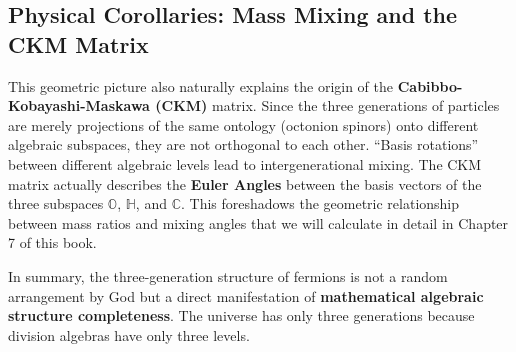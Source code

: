 \subsection{Physical Corollaries: Mass Mixing and the CKM Matrix}

This geometric picture also naturally explains the origin of the \textbf{Cabibbo-Kobayashi-Maskawa (CKM)} matrix.
Since the three generations of particles are merely projections of the same ontology (octonion spinors) onto different algebraic subspaces, they are not orthogonal to each other. ``Basis rotations'' between different algebraic levels lead to intergenerational mixing.
The CKM matrix actually describes the \textbf{Euler Angles} between the basis vectors of the three subspaces $\mathbb{O}$, $\mathbb{H}$, and $\mathbb{C}$. This foreshadows the geometric relationship between mass ratios and mixing angles that we will calculate in detail in Chapter 7 of this book.

In summary, the three-generation structure of fermions is not a random arrangement by God but a direct manifestation of \textbf{mathematical algebraic structure completeness}. The universe has only three generations because division algebras have only three levels.
